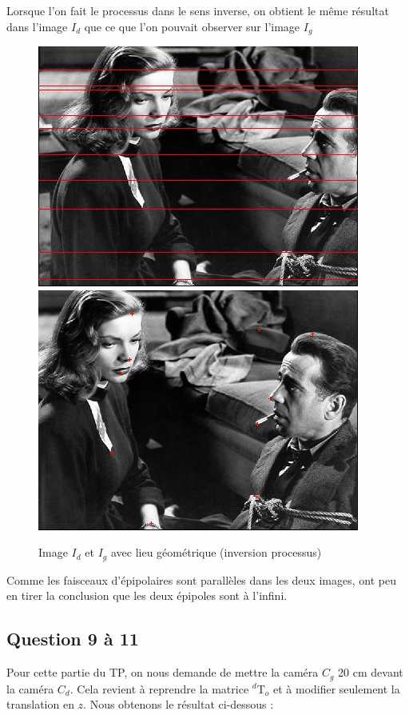 \documentclass[12pt]{report}
\begin{document}
Lorsque l'on fait le processus dans le sens inverse, on obtient le même résultat dans l'image $I_d$ que ce que l'on pouvait observer sur l'image $I_g$

\begin{figure}[H]
\begin{center}
\includegraphics[scale=0.5]{Image/I2d.jpg} 
\includegraphics[scale=0.5]{Image/I2g.jpg} 
\caption{Image $I_d$ et $I_g$ avec lieu géométrique (inversion processus)}
\end{center}
\end{figure}

Comme les faisceaux d'épipolaires sont parallèles dans les deux images, ont peu en tirer la conclusion que les deux épipoles sont à l'infini.

\subsection*{Question 9 à 11}

Pour cette partie du TP, on nous demande de mettre la caméra $C_g$ 20 cm devant la caméra $C_d$. Cela revient à reprendre la matrice $^{d}\textrm{T}_o$ et à modifier seulement la translation en $z$. Nous obtenons le résultat ci-dessous :
\end{document}

